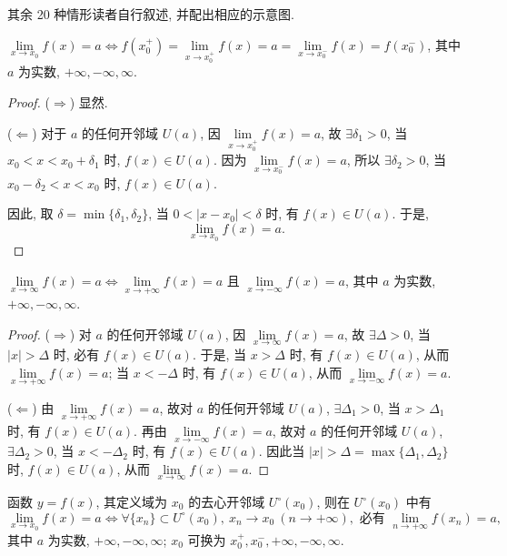 其余 20 种情形读者自行叙述, 并配出相应的示意图.

\begin{theorem}\label{thm:2.1.1}
$\lim\limits_{x \to x_0} f(x) = a \iff f(x_0^+) = \lim\limits_{x \to x_0^+} f(x) = a = \lim\limits_{x \to x_0^-} f(x) = f(x_0^-)$, 其中 $a$ 为实数, $+\infty, -\infty, \infty$.
\end{theorem}

\begin{proof}
($\Rightarrow$) 显然.

($\Leftarrow$) 对于 $a$ 的任何开邻域 $U(a)$, 因 $\lim\limits_{x\to x_0^+}f(x)=a$, 故 $\exists\delta_1>0$, 当 $x_0<x<x_0+\delta_1$ 时, $f(x)\in U(a)$. 因为 $\lim\limits_{x\to x_0^-}f(x)=a$, 所以 $\exists\delta_2>0$, 当 $x_0-\delta_2<x<x_0$ 时, $f(x)\in U(a)$.

因此, 取 $\delta = \min\{\delta_1, \delta_2\}$, 当 $0 < |x - x_0| < \delta$ 时, 有 $f(x) \in U(a)$. 于是,
\[
\lim_{x\to x_{0}}f(x)=a.
\]
\end{proof}

\begin{theorem}\label{thm:2.1.2}
$\lim\limits_{x\to\infty}f(x)=a \iff \lim\limits_{x\to+\infty}f(x)=a$ 且 $\lim\limits_{x\to-\infty}f(x)=a$, 其中 $a$ 为实数, $+\infty, -\infty, \infty$.
\end{theorem}

\begin{proof}
($\Rightarrow$) 对 $a$ 的任何开邻域 $U(a)$, 因 $\lim\limits_{x\to\infty}f(x)=a$, 故 $\exists\Delta>0$, 当 $|x|>\Delta$ 时, 必有 $f(x)\in U(a)$. 于是, 当 $x>\Delta$ 时, 有 $f(x)\in U(a)$, 从而 $\lim\limits_{x\to+\infty}f(x)=a$; 当 $x < -\Delta$ 时, 有 $f(x) \in U(a)$, 从而 $\lim\limits_{x\to-\infty} f(x) = a$.

($\Leftarrow$) 由 $\lim\limits_{x\to+\infty}f(x)=a$, 故对 $a$ 的任何开邻域 $U(a)$, $\exists\Delta_{1}>0$, 当 $x>\Delta_{1}$ 时, 有 $f(x)\in U(a)$. 再由 $\lim\limits_{x\to-\infty}f(x)=a$, 故对 $a$ 的任何开邻域 $U(a)$, $\exists\Delta_{2}>0$, 当 $x<-\Delta_{2}$ 时, 有 $f(x)\in U(a)$. 因此当 $|x|>\Delta=\max\{\Delta_{1},\Delta_{2}\}$ 时, $f(x)\in U(a)$, 从而 $\lim\limits_{x\to\infty}f(x)=a$.
\end{proof}

\begin{theorem}\label{thm:2.1.3}
函数 $y = f(x)$, 其定义域为 $x_{0}$ 的去心开邻域 $U^{\circ}(x_{0})$, 则在 $U^{\circ}(x_{0})$ 中有
\[
\lim_{x\to x_0}f(x)=a \iff \forall \{x_n\}\subset U^\circ(x_0),\ x_n\to x_0\ (n\to+\infty),\text{ 必有 } \lim_{n\to+\infty}f(x_n)=a,
\]
其中 $a$ 为实数, $+\infty, -\infty, \infty$; $x_0$ 可换为 $x_0^+, x_0^-, +\infty, -\infty, \infty$.
\end{theorem}

